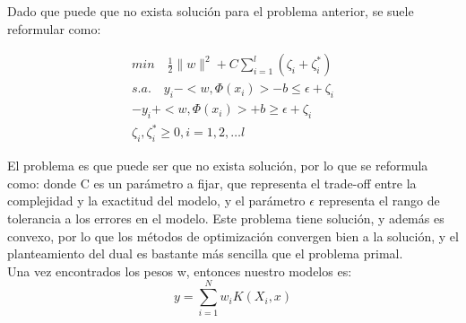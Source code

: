 	
	Dado que puede que no exista soluci\'on para el problema anterior, se suele reformular como:
	
	\begin{equation}\label{eq2}
	\begin{gathered}
	min \quad \frac{1}{2} \| w \|^2 + C \sum_{i=1}^{l} (\zeta_i +  \zeta_i^*) \\  
	s.a. \quad y_i- < w, \Phi(x_i) > -b \le \epsilon + \zeta_i\\
	-y_i+ < w, \Phi(x_i) > +b \geq \epsilon + \zeta_i\\
	\zeta_i,  \zeta_i^* \ge 0, i = 1, 2, \dots l
	\end{gathered}
	\end{equation}
	
	
	
	
	El problema es que puede ser que no exista soluci\'on, por lo que se reformula como:
	donde C es un par\'ametro a fijar, que representa el trade-off entre la complejidad y la exactitud del modelo, y el par\'ametro $\epsilon$ representa el rango de tolerancia a los errores en el modelo. Este problema tiene soluci\'on, y adem\'as es convexo, por lo que los m\'etodos de optimizaci\'on convergen bien a la soluci\'on, y el planteamiento del dual es bastante m\'as sencilla que el problema primal.\\
	\vspace{4mm}	
	Una vez encontrados los pesos w, entonces nuestro modelos es:
	\begin{equation*} 
	y = \sum_{i=1}^{N} w_i K(X_i,x)
	\end{equation*}
	

